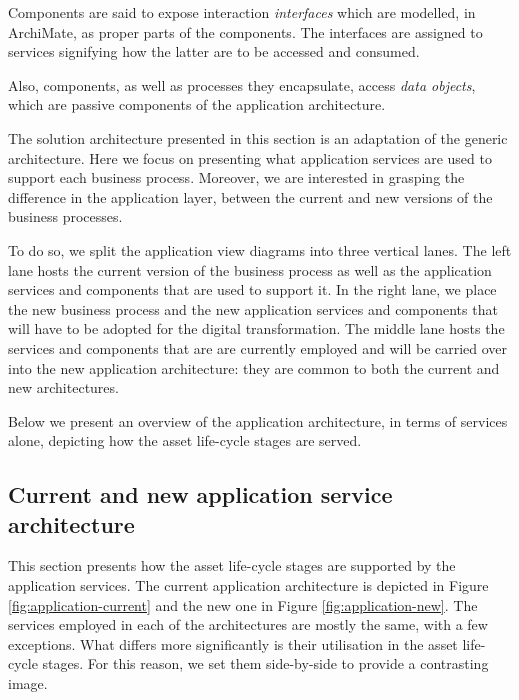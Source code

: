 	Components are said to expose interaction \textit{interfaces} which are modelled, in ArchiMate, as proper parts of the components. The interfaces are assigned to services signifying how the latter are to be accessed and consumed. 
	
	Also, components, as well as processes they encapsulate, access \textit{data objects}, which are passive components of the application architecture.

	The solution architecture presented in this section is an adaptation of the generic architecture. Here we focus on presenting what application services are used to support each business process. Moreover, we are interested in grasping the difference in the application layer, between the current and new versions of the business processes. 
	
	To do so, we split the application view diagrams into three vertical lanes. The left lane hosts the current version of the business process as well as the application services and components that are used to support it. In the right lane, we place the new business process and the new application services and components that will have to be adopted for the digital transformation. The middle lane hosts the services and components that are are currently employed and will be carried over into the new application architecture: they are common to both the current and new architectures.

	Below we present an overview of the application architecture, in terms of services alone, depicting how the asset life-cycle stages are served.
	
	\subsection{Current and new application service architecture}
	\label{sec:application-overview}
	
	This section presents how the asset life-cycle stages are supported by the application services. The current application architecture is depicted in Figure \ref{fig:application-current} and the new one in Figure \ref{fig:application-new}. The services employed in each of the architectures are mostly the same, with a few exceptions. What differs more significantly is their utilisation in the asset life-cycle stages. For this reason, we set them side-by-side to provide a contrasting image. 
	
